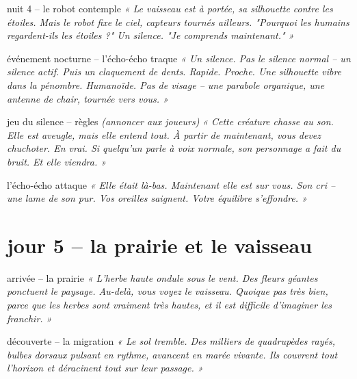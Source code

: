 \documentclass[10pt, a4paper]{article}
\begin{document}
\begin{transitionbox}{nuit 4 -- le robot contemple}
\textit{« Le vaisseau est à portée, sa silhouette contre les étoiles. Mais le robot fixe le ciel, capteurs tournés ailleurs. "Pourquoi les humains regardent-ils les étoiles ?" Un silence. "Je comprends maintenant." »}
\end{transitionbox}

\begin{creaturebox}{événement nocturne -- l'écho-écho traque}
\textit{« Un silence. Pas le silence normal -- un silence actif. Puis un claquement de dents. Rapide. Proche. Une silhouette vibre dans la pénombre. Humanoïde. Pas de visage -- une parabole organique, une antenne de chair, tournée vers vous. »}
\end{creaturebox}

\begin{momentbox}{jeu du silence -- règles}
\textit{(annoncer aux joueurs)}
\textit{« Cette créature chasse au son. Elle est aveugle, mais elle entend tout. À partir de maintenant, vous devez chuchoter. En vrai. Si quelqu'un parle à voix normale, son personnage a fait du bruit. Et elle viendra. »}
\end{momentbox}

\begin{momentbox}{l'écho-écho attaque}
\textit{« Elle était là-bas. Maintenant elle est sur vous. Son cri -- une lame de son pur. Vos oreilles saignent. Votre équilibre s'effondre. »}
\end{momentbox}

\section*{jour 5 -- la prairie et le vaisseau}

\begin{zonebox}{arrivée -- la prairie}
\textit{« L'herbe haute ondule sous le vent. Des fleurs géantes ponctuent le paysage. Au-delà, vous voyez le vaisseau. Quoique pas très bien, parce que les herbes sont vraiment très hautes, et il est difficile d'imaginer les franchir. »}
\end{zonebox}

\begin{obstaclebox}{découverte -- la migration}
\textit{« Le sol tremble. Des milliers de quadrupèdes rayés, bulbes dorsaux pulsant en rythme, avancent en marée vivante. Ils couvrent tout l'horizon et déracinent tout sur leur passage. »}
\end{obstaclebox}
\end{document}
